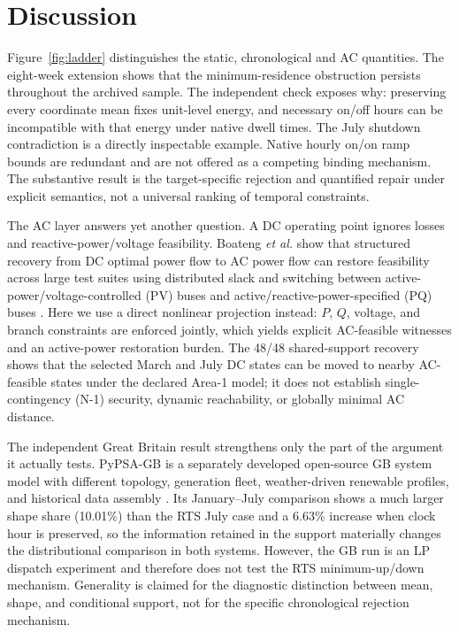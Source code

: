 \documentclass[journal]{IEEEtran}
\begin{document}
\section{Discussion}
Figure~\ref{fig:ladder} distinguishes the static, chronological and AC quantities. The eight-week extension shows that the minimum-residence obstruction persists throughout the archived sample. The independent check exposes why: preserving every coordinate mean fixes unit-level energy, and necessary on/off hours can be incompatible with that energy under native dwell times. The July shutdown contradiction is a directly inspectable example. Native hourly on/on ramp bounds are redundant and are not offered as a competing binding mechanism. The substantive result is the target-specific rejection and quantified repair under explicit semantics, not a universal ranking of temporal constraints.

The AC layer answers yet another question. A DC operating point ignores losses and reactive-power/voltage feasibility. Boateng \emph{et al.} show that structured recovery from DC optimal power flow to AC power flow can restore feasibility across large test suites using distributed slack and switching between active-power/voltage-controlled (PV) buses and active/reactive-power-specified (PQ) buses \cite{Boateng2027}. Here we use a direct nonlinear projection instead: $P$, $Q$, voltage, and branch constraints are enforced jointly, which yields explicit AC-feasible witnesses and an active-power restoration burden. The 48/48 shared-support recovery shows that the selected March and July DC states can be moved to nearby AC-feasible states under the declared Area-1 model; it does not establish single-contingency (N-1) security, dynamic reachability, or globally minimal AC distance.

The independent Great Britain result strengthens only the part of the argument it actually tests. PyPSA-GB is a separately developed open-source GB system model with different topology, generation fleet, weather-driven renewable profiles, and historical data assembly \cite{Lyden2024}. Its January--July comparison shows a much larger shape share (10.01\%) than the RTS July case and a 6.63\% increase when clock hour is preserved, so the information retained in the support materially changes the distributional comparison in both systems. However, the GB run is an LP dispatch experiment and therefore does not test the RTS minimum-up/down mechanism. Generality is claimed for the diagnostic distinction between mean, shape, and conditional support, not for the specific chronological rejection mechanism.
\end{document}
